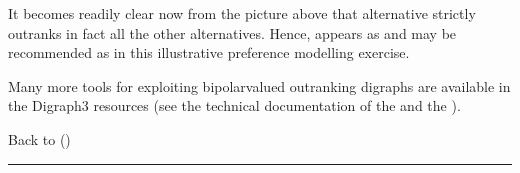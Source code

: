 \documentclass[a4paper,12pt,english]{sphinxhowto}
\begin{document}
It becomes readily clear now from the picture above that alternative  strictly outranks in fact all the other alternatives. Hence,  appears as  and may be recommended as  in this illustrative preference modelling exercise.

Many more tools for exploiting bipolar\sphinxhyphen{}valued outranking digraphs are available in the Digraph3 resources (see the technical documentation of the  and the ).

Back to {\hyperref[\detokenize{tutorial:tutorial-label}]{}} ()


\bigskip\hrule\bigskip
\end{document}
